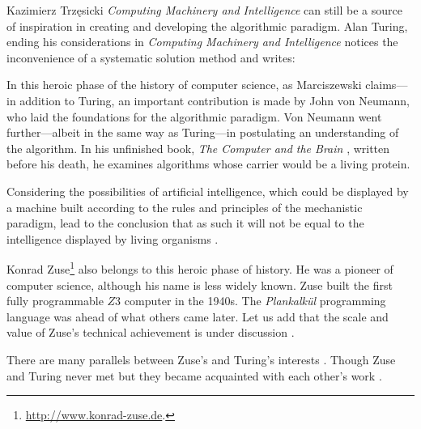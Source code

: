 \begin{artengenv}{Kazimierz Trzęsicki}
\emph{Computing Machinery and Intelligence} \parencite*{Turing1950} can still be a source of inspiration in creating and developing the algorithmic  paradigm. Alan Turing, ending his considerations in \emph{Computing Machinery and Intelligence} \parencite*[p.64]{Turing1950} notices the inconvenience of a systematic solution method and writes: 

In this heroic phase of the history of computer science, as Marciszewski \parencite*[p.165]{MarciszewskiStacewicz2011} claims---in addition to Turing, an important contribution is made by John von Neumann, who laid the foundations for the algorithmic  paradigm. Von Neumann went further---albeit in the same way as Turing---in postulating an understanding of the algorithm. In his unfinished book, \emph{The Computer and the Brain} \parencite*{vonNeumann1958}, written before his death, he examines algorithms whose carrier would be a living protein.

Considering the possibilities of artificial intelligence, which could be displayed by a machine built according to the rules and principles of the mechanistic paradigm, lead to the conclusion that as such it will not be equal to the intelligence displayed by living organisms \parencite{Trzesicki2006slgr}.


 Konrad Zuse\footnote{\url{http://www.konrad-zuse.de}.}  also belongs to this heroic phase of history. He was a pioneer of computer science, although his name is less widely known. Zuse built the first fully programmable $Z3$ computer in the 1940s. The \textit{Plankalk{\"u}l} programming language was ahead of what others came later. Let us add that the scale and value of Zuse's technical achievement is under discussion \parencite[p.448]{CopelandSprevakShagrir2017}.

There are many parallels between Zuse's and Turing's interests \parencite[p.58]{Zuse2012a}. Though Zuse and Turing never met but they became acquainted with each other’s
work \parencite[p.60]{German2012}.



\end{artengenv}
